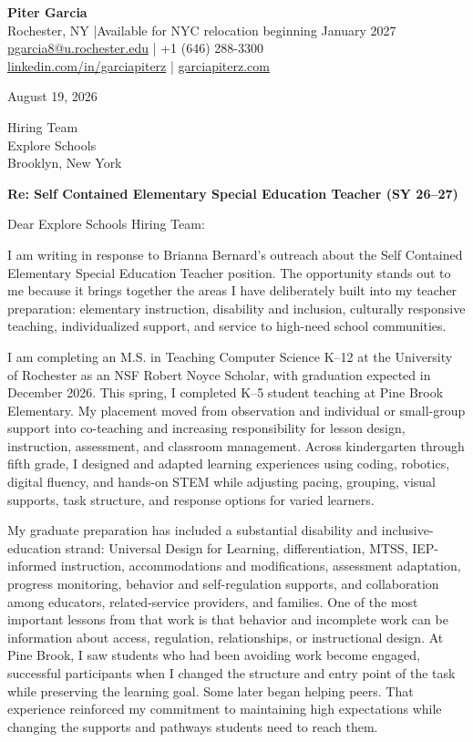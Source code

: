 \documentclass[11pt,letterpaper]{article}
\begin{document}
\textbf{\Large Piter Garcia}\\
Rochester, NY \enspace|\enspace Available for NYC relocation beginning January 2027\\
\href{mailto:pgarcia8@u.rochester.edu}{pgarcia8@u.rochester.edu} \enspace|\enspace
+1 (646) 288-3300\\
\href{https://linkedin.com/in/garciapiterz}{linkedin.com/in/garciapiterz}
\enspace|\enspace
\href{https://garciapiterz.com}{garciapiterz.com}

\vspace{10pt}
August 19, 2026

Hiring Team\\
Explore Schools\\
Brooklyn, New York

\textbf{Re: Self Contained Elementary Special Education Teacher (SY 26--27)}

Dear Explore Schools Hiring Team:

I am writing in response to Brianna Bernard's outreach about the Self Contained
Elementary Special Education Teacher position. The opportunity stands out to me
because it brings together the areas I have deliberately built into my teacher
preparation: elementary instruction, disability and inclusion, culturally
responsive teaching, individualized support, and service to high-need school
communities.

I am completing an M.S. in Teaching Computer Science K--12 at the University of
Rochester as an NSF Robert Noyce Scholar, with graduation expected in December
2026. This spring, I completed K--5 student teaching at Pine Brook Elementary.
My placement moved from observation and individual or small-group support into
co-teaching and increasing responsibility for lesson design, instruction,
assessment, and classroom management. Across kindergarten through fifth grade,
I designed and adapted learning experiences using coding, robotics, digital
fluency, and hands-on STEM while adjusting pacing, grouping, visual supports,
task structure, and response options for varied learners.

My graduate preparation has included a substantial disability and inclusive-
education strand: Universal Design for Learning, differentiation, MTSS,
IEP-informed instruction, accommodations and modifications, assessment
adaptation, progress monitoring, behavior and self-regulation supports, and
collaboration among educators, related-service providers, and families. One of
the most important lessons from that work is that behavior and incomplete work
can be information about access, regulation, relationships, or instructional
design. At Pine Brook, I saw students who had been avoiding work become engaged,
successful participants when I changed the structure and entry point of the
task while preserving the learning goal. Some later began helping peers. That
experience reinforced my commitment to maintaining high expectations while
changing the supports and pathways students need to reach them.
\end{document}
